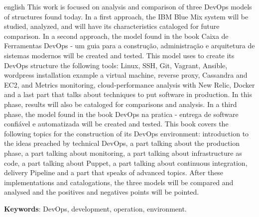 \begin{resumo}[Abstract]
	\begin{otherlanguage*}{english}		
This work is focused on analysis and comparison of three 
DevOps models of structures found today. In a first
approach, the IBM Blue Mix system will be studied, analyzed, and
will have its characteristics cataloged for future comparison.
In a second approach, the model found
in the book Caixa de Ferramentas DevOps - um guia para a construção, 
	administração e arquitetura de sistemas modernos will be created
	and tested. This model uses
to create its DevOps structure the following tools: Linux,
SSH, Git, Vagrant, Ansible, wordpress installation example
a virtual machine, reverse proxy, Cassandra and EC2, and Metrics
monitoring, cloud-performance analysis with New Relic, Docker
and a last part that talks about techniques to put software
	in production. In this phase,
results will also be cataloged for comparisons and analysis.
In a third phase, the model found in the book
DevOps na pratica - entrega de software confiável e automatizada will 
be created and tested.
This book covers the following topics for the construction of its
DevOps environment: introduction to the ideas preached by technical
DevOps, a part talking about the production phase, a part
talking about monitoring, a part talking about
infrastructure as code, a part talking about Puppet,
a part talking about continuous integration, delivery Pipeline
and a part that speaks of advanced topics. After these implementations
and catalogations, the three models will be compared and analysed and 
the positives and negatives points will be pointed.

		\vspace{\onelineskip}
		\noindent
		\textbf{Keywords}: DevOps, development, operation, environment.
	\end{otherlanguage*}
\end{resumo}